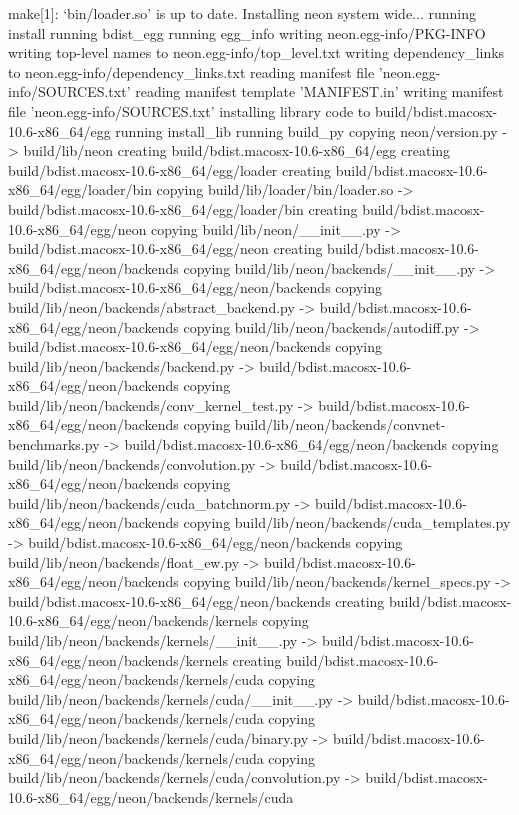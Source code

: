 make[1]: `bin/loader.so' is up to date.
Installing neon system wide...
running install
running bdist_egg
running egg_info
writing neon.egg-info/PKG-INFO
writing top-level names to neon.egg-info/top_level.txt
writing dependency_links to neon.egg-info/dependency_links.txt
reading manifest file 'neon.egg-info/SOURCES.txt'
reading manifest template 'MANIFEST.in'
writing manifest file 'neon.egg-info/SOURCES.txt'
installing library code to build/bdist.macosx-10.6-x86_64/egg
running install_lib
running build_py
copying neon/version.py -> build/lib/neon
creating build/bdist.macosx-10.6-x86_64/egg
creating build/bdist.macosx-10.6-x86_64/egg/loader
creating build/bdist.macosx-10.6-x86_64/egg/loader/bin
copying build/lib/loader/bin/loader.so -> build/bdist.macosx-10.6-x86_64/egg/loader/bin
creating build/bdist.macosx-10.6-x86_64/egg/neon
copying build/lib/neon/__init__.py -> build/bdist.macosx-10.6-x86_64/egg/neon
creating build/bdist.macosx-10.6-x86_64/egg/neon/backends
copying build/lib/neon/backends/__init__.py -> build/bdist.macosx-10.6-x86_64/egg/neon/backends
copying build/lib/neon/backends/abstract_backend.py -> build/bdist.macosx-10.6-x86_64/egg/neon/backends
copying build/lib/neon/backends/autodiff.py -> build/bdist.macosx-10.6-x86_64/egg/neon/backends
copying build/lib/neon/backends/backend.py -> build/bdist.macosx-10.6-x86_64/egg/neon/backends
copying build/lib/neon/backends/conv_kernel_test.py -> build/bdist.macosx-10.6-x86_64/egg/neon/backends
copying build/lib/neon/backends/convnet-benchmarks.py -> build/bdist.macosx-10.6-x86_64/egg/neon/backends
copying build/lib/neon/backends/convolution.py -> build/bdist.macosx-10.6-x86_64/egg/neon/backends
copying build/lib/neon/backends/cuda_batchnorm.py -> build/bdist.macosx-10.6-x86_64/egg/neon/backends
copying build/lib/neon/backends/cuda_templates.py -> build/bdist.macosx-10.6-x86_64/egg/neon/backends
copying build/lib/neon/backends/float_ew.py -> build/bdist.macosx-10.6-x86_64/egg/neon/backends
copying build/lib/neon/backends/kernel_specs.py -> build/bdist.macosx-10.6-x86_64/egg/neon/backends
creating build/bdist.macosx-10.6-x86_64/egg/neon/backends/kernels
copying build/lib/neon/backends/kernels/__init__.py -> build/bdist.macosx-10.6-x86_64/egg/neon/backends/kernels
creating build/bdist.macosx-10.6-x86_64/egg/neon/backends/kernels/cuda
copying build/lib/neon/backends/kernels/cuda/__init__.py -> build/bdist.macosx-10.6-x86_64/egg/neon/backends/kernels/cuda
copying build/lib/neon/backends/kernels/cuda/binary.py -> build/bdist.macosx-10.6-x86_64/egg/neon/backends/kernels/cuda
copying build/lib/neon/backends/kernels/cuda/convolution.py -> build/bdist.macosx-10.6-x86_64/egg/neon/backends/kernels/cuda
